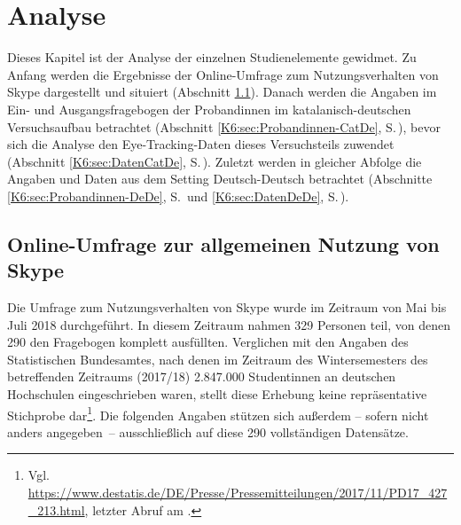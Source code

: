 \chapter{Analyse} %

\label{K6} %
\begin{sloppypar}
Dieses Kapitel ist der Analyse der einzelnen Studienelemente gewidmet. Zu Anfang werden die Ergebnisse der Online-Umfrage zum Nutzungsverhalten von Skype dargestellt und situiert (Abschnitt \ref{K6:sec:UmfrageAllg}). Danach werden die Angaben im Ein- und Ausgangsfragebogen der Proband{\textperiodcentered}innen im katalanisch-deutschen Versuchsaufbau betrachtet (Abschnitt \ref{K6:sec:Probandinnen-CatDe}, S.\,\pageref{K6:sec:Probandinnen-CatDe}), bevor sich die Analyse den Eye-Tracking-Daten dieses Versuchsteils zuwendet (Abschnitt \ref{K6:sec:DatenCatDe}, S.\,\pageref{K6:sec:DatenCatDe}). Zuletzt werden in gleicher Abfolge die Angaben und Daten aus dem Setting Deutsch-Deutsch betrachtet (Abschnitte \ref{K6:sec:Probandinnen-DeDe}, S.\,\pageref{K6:sec:Probandinnen-DeDe} und \ref{K6:sec:DatenDeDe}, S.\,\pageref{K6:sec:DatenDeDe}).
\end{sloppypar}

\section{Online-Umfrage zur allgemeinen Nutzung von Skype}

\label{K6:sec:UmfrageAllg}


Die Umfrage zum Nutzungsverhalten von Skype wurde im Zeitraum von Mai bis Juli 2018 durchgeführt. In diesem Zeitraum nahmen 329 Personen teil, von denen 290 den Fragebogen komplett ausfüllten. Verglichen mit den Angaben des Statistischen Bundesamtes, nach denen im Zeitraum des Wintersemesters des betreffenden Zeitraums (2017/18) 2.847.000 Student{\textperiodcentered}innen an deutschen Hochschulen eingeschrieben waren, stellt diese Erhebung keine repräsentative Stichprobe dar\footnote{Vgl. \url{https://www.destatis.de/DE/Presse/Pressemitteilungen/2017/11/PD17_427_213.html}, letzter Abruf am \datum{}.}. Die folgenden Angaben stützen sich außerdem -- sofern nicht anders angegeben~-- ausschließlich auf diese 290 vollständigen Datensätze.

